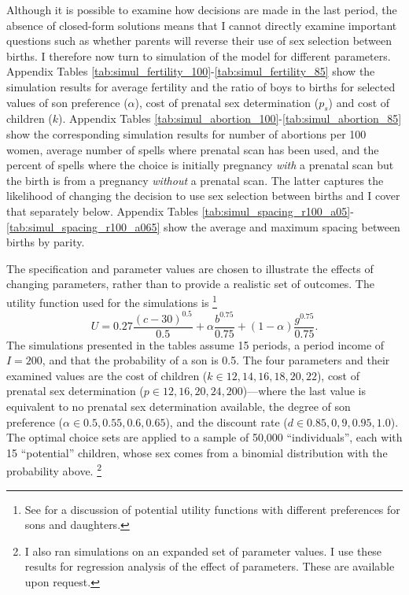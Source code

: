 \documentclass[12pt,letterpaper]{article}
\begin{document}
Although it is possible to examine how decisions are made in the last period,
the absence of closed-form solutions means that I cannot directly 
examine important questions such as whether parents will reverse their
use of sex selection between births.
I therefore now turn to simulation of the model for different parameters.
Appendix Tables \ref{tab:simul_fertility_100}-\ref{tab:simul_fertility_85} 
show the simulation results for average  fertility and the ratio of boys to births for 
selected values of son preference ($\alpha$), cost of prenatal sex determination ($p_s$) 
and cost of children ($k$).
Appendix Tables \ref{tab:simul_abortion_100}-\ref{tab:simul_abortion_85}
show the corresponding simulation results for number of abortions per 100 women, 
average number of spells where prenatal scan has been used, 
and the percent of spells where the choice is initially
pregnancy \emph{with} a prenatal scan but the birth is from a pregnancy \emph{without}
a prenatal scan.
The latter captures the likelihood of changing the decision to use sex selection
between births and I cover that separately below.
Appendix Tables \ref{tab:simul_spacing_r100_a05}-\ref{tab:simul_spacing_r100_a065}
show the average and maximum spacing between births by parity.

The specification and parameter values are chosen to illustrate
the effects of changing parameters, rather than to provide
a realistic set of outcomes.
The utility function used for the simulations is%
\footnote{
See \citet{leung94} for a discussion of potential utility
functions with different preferences for sons and daughters.
}
\[
U = 0.27\frac{(c-30)^{0.5}}{0.5} + \alpha \frac{b^{0.75}}{0.75} + (1-\alpha) \frac{g^{0.75}}{0.75}.
\]
The simulations presented in the tables assume 15 periods, a period income of 
$I = 200$, and that the probability of a son is 0.5.
The four parameters and their examined values are the cost of 
children ($k \in 12, 14, 16, 18, 20, 22$), 
cost of prenatal sex determination ($p \in 12, 16, 20, 24,  200$)---where 
the last value is equivalent to no prenatal sex determination available,
the degree of son preference ($\alpha \in 0.5, 0.55, 0.6, 0.65$),
and the discount rate ($d \in 0.85, 0,9, 0.95, 1.0$).
The optimal choice sets are applied to a sample of 50,000 ``individuals'', each 
with 15 ``potential'' children, whose sex comes from a binomial distribution 
with the probability above.%
\footnote{
I also ran simulations on an expanded set of parameter values.
I use these results for regression analysis of the effect of parameters.
These are available upon request.
}
\end{document}
